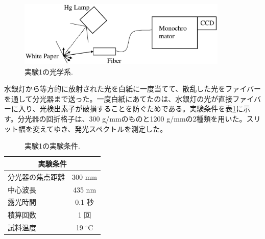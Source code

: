 \documentclass[11pt,a4j]{jsarticle}
\begin{document}
\begin{figure}[h]
 \centering
 \includegraphics[clip,width=10cm]{start_system1.eps}
 \caption{実験1の光学系.}
 \label{fig_system1}
\end{figure}

水銀灯から等方的に放射された光を白紙に一度当てて、散乱した光をファイバーを通して分光器まで送った。一度白紙にあてたのは、水銀灯の光が直接ファイバーに入り、光検出素子が破損することを防ぐためである。実験条件を表\ref{col_1}に示す。分光器の回折格子は、300 g/mmのものと1200 g/mmの2種類を用いた。スリット幅を変えてゆき、発光スペクトルを測定した。

\begin{table}[ht]
 \centering
 \caption{実験1の実験条件.}
 \begin{tabular}{lc}\hline
  \multicolumn{2}{c}{実験条件}      \\ \hline
  分光器の焦点距離 & 300 mm         \\
  中心波長         & 435 nm         \\
  露光時間         & 0.1 秒         \\
  積算回数         & 1 回           \\
  試料温度         & 19 ${}^\circ$C \\ \hline
 \end{tabular}
 \label{col_1}
\end{table}

\end{document}
